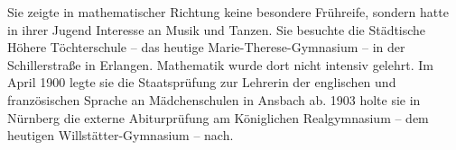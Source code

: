 Sie zeigte in mathematischer Richtung keine besondere Frühreife, sondern hatte in ihrer Jugend Interesse an Musik und Tanzen. Sie besuchte die Städtische Höhere Töchterschule – das heutige Marie-Therese-Gymnasium – in der Schillerstraße in Erlangen. Mathematik wurde dort nicht intensiv gelehrt. Im April 1900 legte sie die Staatsprüfung zur Lehrerin der englischen und französischen Sprache an Mädchenschulen in Ansbach ab. 1903 holte sie in Nürnberg die externe Abiturprüfung am Königlichen Realgymnasium – dem heutigen Willstätter-Gymnasium – nach. 


\newpage
